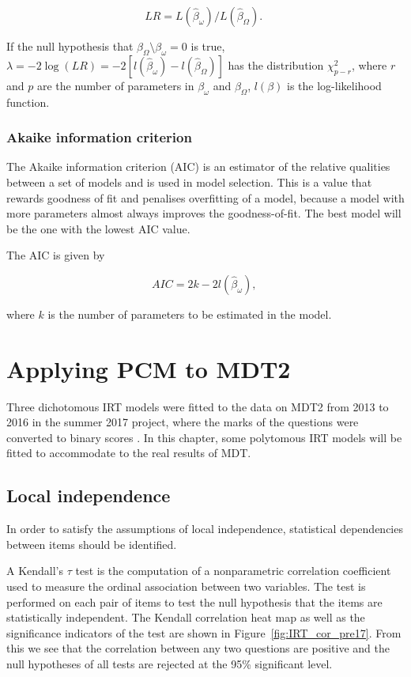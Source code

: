 \documentclass[a4paper]{report}
\begin{document}
$$LR = L(\hat\beta_\omega) / L(\hat\beta_\Omega) \text{. }$$

If the null hypothesis that $\beta_\Omega \setminus \beta_\omega = 0$ is true, $\lambda = -2 \log (LR) = -2[l(\hat\beta_\omega) - l(\hat\beta_\Omega)]$ has the distribution $\chi^2_{p-r}$, where $r$ and $p$ are the number of parameters in $\beta_\omega$ and $\beta_\Omega$, $l(\beta)$ is the log-likelihood function. 

\subsection{Akaike information criterion}

The Akaike information criterion (AIC) is an estimator of the relative qualities between a set of models and is used in model selection. This is a value that rewards goodness of fit and penalises overfitting of a model, because a model with more parameters almost always improves the goodness-of-fit. The best model will be the one with the lowest AIC value. 

The AIC is given by 

$$AIC = 2k - 2l(\hat\beta_\omega) \text{, }$$

\noindent
where $k$ is the number of parameters to be estimated in the model. 


\chapter{\label{chap:PCM_pre17}Applying PCM to MDT2}

Three dichotomous IRT models were fitted to the data on MDT2 from 2013 to 2016 in the summer 2017 project, where the marks of the questions were converted to binary scores \cite{lastyear}. In this chapter, some polytomous IRT models will be fitted to accommodate to the real results of MDT. 

\section{Local independence}

In order to satisfy the assumptions of local independence, statistical dependencies between items should be identified. 

A Kendall's $\tau$ test is the computation of a nonparametric correlation coefficient used to measure the ordinal association between two variables. The test is performed on each pair of items to test the null hypothesis that the items are statistically independent. The Kendall correlation heat map as well as the significance indicators of the test are shown in Figure~\ref{fig:IRT_cor_pre17}. From this we see that the correlation between any two questions are positive and the null hypotheses of all tests are rejected at the 95\% significant level. 
\end{document}
